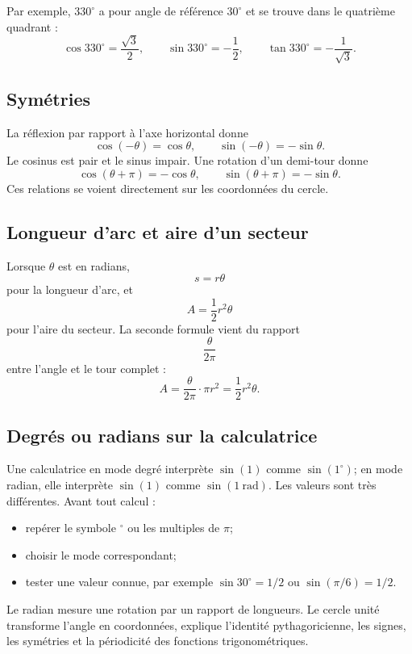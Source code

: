 \documentclass[12pt,a4paper,openany]{book}
\begin{document}
Par exemple, $330^\circ$ a pour angle de référence $30^\circ$ et se trouve dans le quatrième quadrant :
\[
\cos330^\circ=\frac{\sqrt3}{2},
\qquad
\sin330^\circ=-\frac12,
\qquad
\tan330^\circ=-\frac1{\sqrt3}.
\]

\subsection{Symétries}

La réflexion par rapport à l'axe horizontal donne
\[
\cos(-\theta)=\cos\theta,
\qquad
\sin(-\theta)=-\sin\theta.
\]
Le cosinus est pair et le sinus impair. Une rotation d'un demi-tour donne
\[
\cos(\theta+\pi)=-\cos\theta,
\qquad
\sin(\theta+\pi)=-\sin\theta.
\]
Ces relations se voient directement sur les coordonnées du cercle.

\subsection{Longueur d'arc et aire d'un secteur}

Lorsque $\theta$ est en radians,
\[
s=r\theta
\]
pour la longueur d'arc, et
\[
A=\frac12r^2\theta
\]
pour l'aire du secteur. La seconde formule vient du rapport
\[
\frac{\theta}{2\pi}
\]
entre l'angle et le tour complet :
\[
A=\frac{\theta}{2\pi}\cdot\pi r^2=\frac12r^2\theta.
\]

\subsection{Degrés ou radians sur la calculatrice}

Une calculatrice en mode degré interprète $\sin(1)$ comme $\sin(1^\circ)$; en mode radian, elle interprète $\sin(1)$ comme $\sin(1\ \text{rad})$. Les valeurs sont très différentes. Avant tout calcul :
\begin{itemize}
\item repérer le symbole $^\circ$ ou les multiples de $\pi$;
\item choisir le mode correspondant;
\item tester une valeur connue, par exemple $\sin30^\circ=1/2$ ou $\sin(\pi/6)=1/2$.
\end{itemize}

\begin{summarybox}
Le radian mesure une rotation par un rapport de longueurs. Le cercle unité transforme l'angle en coordonnées, explique l'identité pythagoricienne, les signes, les symétries et la périodicité des fonctions trigonométriques.
\end{summarybox}
\end{document}
